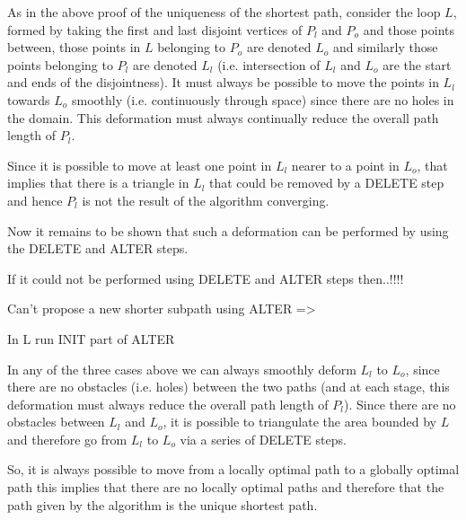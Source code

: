 As in the above proof of the uniqueness of the shortest path, consider the loop $L$, formed by taking the first and last disjoint vertices of $P_l$ and $P_o$ and those points between, those points in $L$ belonging to $P_o$ are denoted $L_o$ and similarly those points belonging to $P_l$ are denoted $L_l$ (i.e. intersection of $L_l$ and $L_o$ are the start and ends of the disjointness). It must always be possible to move the points in $L_l$ towards $L_o$ smoothly (i.e. continuously through space) since there are no holes in the domain. This deformation must always continually reduce the overall path length of $P_l$.

Since it is possible to move at least one point in $L_l$ nearer to a point in $L_o$, that implies that there is a triangle in $L_l$ that could be removed by a DELETE step and hence $P_l$ is not the result of the algorithm converging.



Now it remains to be shown that such a deformation can be performed by using the DELETE and ALTER steps. 


If it could not be performed using DELETE and ALTER steps then..!!!!


Can't propose a new shorter subpath using ALTER => 


In L run INIT part of ALTER


In any of the three cases above we can always smoothly deform $L_l$ to $L_o$, since there are no obstacles (i.e. holes) between the two paths (and at each stage, this deformation must always reduce the overall path length of $P_l$). Since there are no obstacles between $L_l$ and $L_o$, it is possible to triangulate the area bounded by $L$ and therefore go from $L_l$ to $L_o$ via a series of DELETE steps. 


So, it is always possible to move from a locally optimal path to a globally optimal path this implies that there are no locally optimal paths and therefore that the path given by the algorithm is the unique shortest path.








